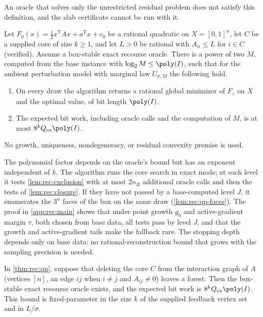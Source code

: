 An oracle that solves only the unrestricted residual problem does not
satisfy this definition, and the slab certificate cannot be run with it.

\begin{theorem}\label{thm:rec:qp}
Let $F_0(x)=\frac12x^{\mathsf T}Ax+a^{\mathsf T}x+c_0$ be a rational quadratic
on $X=[0,1]^n$, let $C$ be a supplied core of size $k\ge1$, and let $L>0$
be rational with $A_{ii}\le L$ for $i\in C$ (verified). Assume a box-stable
exact recourse oracle. There is a power of two $M$, computed from the base
instance with $\log_2M\le\poly(I)$, such that for the ambient perturbation
model with marginal law $U_{\sigma,M}$ the following hold.
\begin{enumerate}[label=(\roman*)]
\item On every draw the algorithm returns a rational global minimizer of
$F_\gamma$ on $X$ and the optimal value, of bit length $\poly(I)$.
\item The expected bit work, including oracle calls and the computation of
$M$, is at most $8^kQ_{\rm ex}\poly(I)$.
\end{enumerate}
No growth, uniqueness, nondegeneracy, or residual convexity premise is used.
\end{theorem}

The polynomial factor depends on the oracle's bound but has an exponent
independent of $k$. The algorithm runs the core search in exact mode; at
each level it tests \cref{lem:rec:exclusion} with at most $2n_R$ additional
oracle calls and then the tests of \cref{lem:rec:closure}. If they have not
passed by a base-computed level $J$, it enumerates the $3^n$ faces of the
box on the same draw (\cref{lem:rec:qp-faces}). The proof in
\cref{app:rec:main} shows that under point growth $g_0$ and active-gradient
margin $\tau$, both chosen from base data, all tests pass by level $J$, and
that the growth and active-gradient tails make the fallback rare. The
stopping depth depends only on base data: no rational-reconstruction bound
that grows with the sampling precision is needed.

\begin{corollary}\label{cor:rec:forest}
In \cref{thm:rec:qp}, suppose that deleting the core $C$ from the
interaction graph of $A$ (vertices $[n]$, an edge $ij$ when $i\ne j$ and
$A_{ij}\ne0$) leaves a forest. Then the box-stable exact recourse oracle
exists, and the expected bit work is $8^kQ_{\rm ex}\poly(I)$. This bound is
fixed-parameter in the size $k$ of the supplied feedback vertex set and in
$L/\sigma$.
\end{corollary}

